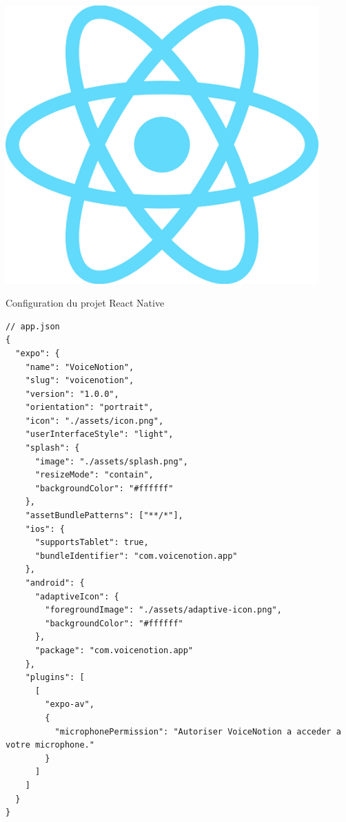 \begin{minipage}{0.25\textwidth}
\centering
\includegraphics[width=0.9\textwidth]{assets/docs/logo_reactnative.png}
\end{minipage}

\begin{codebox}{Configuration du projet React Native}
\begin{lstlisting}
// app.json
{
  "expo": {
    "name": "VoiceNotion",
    "slug": "voicenotion",
    "version": "1.0.0",
    "orientation": "portrait",
    "icon": "./assets/icon.png",
    "userInterfaceStyle": "light",
    "splash": {
      "image": "./assets/splash.png",
      "resizeMode": "contain",
      "backgroundColor": "#ffffff"
    },
    "assetBundlePatterns": ["**/*"],
    "ios": {
      "supportsTablet": true,
      "bundleIdentifier": "com.voicenotion.app"
    },
    "android": {
      "adaptiveIcon": {
        "foregroundImage": "./assets/adaptive-icon.png",
        "backgroundColor": "#ffffff"
      },
      "package": "com.voicenotion.app"
    },
    "plugins": [
      [
        "expo-av",
        {
          "microphonePermission": "Autoriser VoiceNotion a acceder a votre microphone."
        }
      ]
    ]
  }
}
\end{lstlisting}
\end{codebox}

